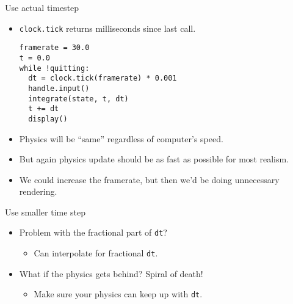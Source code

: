 \documentclass[handout,t,compress]{beamer}
\newcommand{\bframe}[1]{\begin{frame}[fragile]{#1}}
\begin{document}
\bframe{Use actual timestep}
\begin{itemize}
\item {\tt clock.tick} returns milliseconds since last call.
  \begin{Verbatim}[frame=single]
framerate = 30.0
t = 0.0
while !quitting:
  dt = clock.tick(framerate) * 0.001
  handle.input()
  integrate(state, t, dt)
  t += dt       
  display()
  \end{Verbatim}
  \item Physics will be ``same'' regardless of computer's speed.
\item But again physics update should be as fast as possible
  for most realism.
  \item We could increase the framerate, but then we'd be doing
    unnecessary rendering.
\end{itemize}
\end{frame}

\bframe{Use smaller time step}
\begin{itemize}
  \begin{Verbatim}[frame=single]
framerate = 30.0
t = 0.0
dt = 0.01
while !quitting:
  timespan = clock.tick(framerate) * 0.001
  handle.input()
  while (timespan > 0):
    integrate(state, t, dt)
    timespan -= dt
  display()
\end{Verbatim}
\item Problem with the fractional part of {\tt dt}?
  \begin{itemize}  \item Can interpolate for fractional {\tt dt}.
    \end{itemize}
\item What if the physics gets behind?  Spiral of death!
  \begin{itemize}
  \item Make sure your physics can keep up with {\tt dt}.
    \end{itemize}
\end{itemize}
\end{frame}
\end{document}

